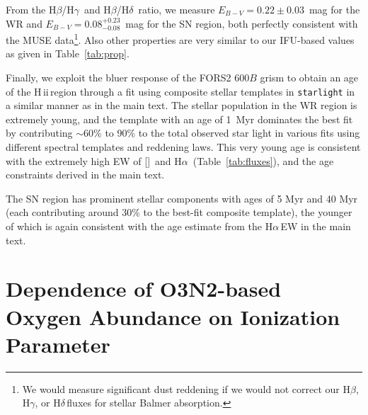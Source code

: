 \documentclass[traditabstract, referee]{aa}
\newcommand{\hb}{H$\beta$}
\newcommand{\ha}{H$\alpha$}
\newcommand{\hg}{H$\gamma$}
\newcommand{\hd}{H$\delta$}
\newcommand{\hii}{\mbox{H\,{\sc ii}}}
\newcommand{\oiii}{[\ion{O}{iii}]}
\begin{document}
\begin{appendix}
From the \hb/\hg\, and \hb/\hd\, ratio, we measure $E_{B-V}=0.22\pm0.03$~mag for the WR and $E_{B-V}=0.08_{-0.08}^{+0.23}$~mag for the SN region, both perfectly consistent with the MUSE data\footnote{We would measure significant dust reddening if we would not correct our \hb, \hg, or \hd\,fluxes for stellar Balmer absorption.}. Also other properties are very similar to our IFU-based values as given in Table~\ref{tab:prop}.

Finally, we exploit the bluer response of the FORS2 600$B$ grism to obtain an age of the \hii\,region through a fit using composite stellar templates in \texttt{starlight} in a similar manner as in the main text. The stellar population in the WR region is extremely young, and the \citet{2003MNRAS.344.1000B} template with an age of 1~Myr dominates the best fit by contributing $\sim$60\% to 90\% to the total observed star light in various fits using different spectral templates and reddening laws. This very young age is consistent with the extremely high EW of \oiii\, and \ha\, (Table~\ref{tab:fluxes}), and the age constraints derived in the main text.

The SN region has prominent stellar components with ages of 5 Myr and 40 Myr (each contributing around 30\% to the best-fit composite template), the younger of which is again consistent with the age estimate from the \ha\,EW in the main text.

\section{Dependence of O3N2-based Oxygen Abundance on Ionization Parameter}
\label{sec:abundancevsion}


\end{appendix}
\end{document}

